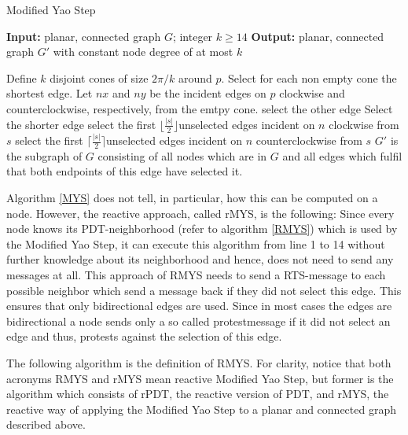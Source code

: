 \algrenewcommand\algorithmicprocedure{\textbf{}}
\begin{algorithm}\small
\caption{Modified Yao Step}\label{MYS}
\begin{algorithmic}[1]
\Statex \textbf{Input:} planar, connected graph $G $; integer $k\geq 14 $
\Statex \textbf{Output:} planar, connected graph $G' $ with constant node degree of at most $k $

\Statex

	\State Define $k $ disjoint cones of size $2\pi/k $ around $p $.
	\State Select for each non empty cone the shortest edge.
			\State Let $nx $ and $ny $ be the incident edges on $p $ clockwise and \State counterclockwise, respectively, from the emtpy cone.
				\State select the other edge
				\Else
				\State Select the shorter edge
			\EndIf 
		\Else
			\State select the first $\lfloor \frac{|s|}{2} \rfloor $unselected edges incident on $n $ clockwise from $s $
			\State select the first $\lceil \frac{|s|}{2} \rceil $unselected edges incident on $n $ counterclockwise from $s $
		\EndIf
	\EndFor
\EndFor
\Statex $ G' $ is the subgraph of $G $ consisting of all nodes which are in $G $ and all edges which fulfil that both endpoints of this edge have selected it. 
\end{algorithmic}
\end{algorithm}
 
Algorithm \ref{MYS} does not tell, in particular, how this can be computed on a node.
However, the reactive approach, called rMYS, is the following: Since every node knows its PDT-neighborhood (refer to algorithm \ref{RMYS}) which is used by the Modified Yao Step, it can execute this algorithm from line 1 to 14 without further knowledge about its neighborhood and hence, does not need to send any messages at all.
This approach of RMYS needs to send a RTS-message to each possible neighbor which send a message back if they did not select this edge.
This ensures that only bidirectional edges are used.
Since in most cases the edges are bidirectional a node sends only a so called protestmessage if it did not select an edge and thus, protests against the selection of this edge.

The following algorithm is the definition of RMYS.
For clarity, notice that both acronyms RMYS and rMYS mean \grqq reactive Modified Yao Step\grqq, but former is the algorithm which consists of rPDT, the reactive version of PDT, and rMYS, the reactive way of applying the Modified Yao Step to a planar and connected graph described above.
 
